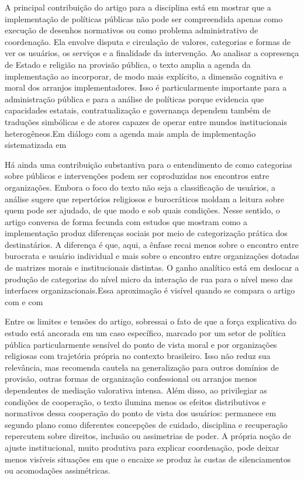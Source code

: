 \documentclass[12pt,a4paper]{article}
\begin{document}
A principal contribuição do artigo para a disciplina está em mostrar que a implementação de políticas públicas não pode ser compreendida apenas como execução de desenhos normativos ou como problema administrativo de coordenação. Ela envolve disputa e circulação de valores, categorias e formas de ver os usuários, os serviços e a finalidade da intervenção. Ao analisar a copresença de Estado e religião na provisão pública, o texto amplia a agenda da implementação ao incorporar, de modo mais explícito, a dimensão cognitiva e moral dos arranjos implementadores. Isso é particularmente importante para a administração pública e para a análise de políticas porque evidencia que capacidades estatais, contratualização e governança dependem também de traduções simbólicas e de atores capazes de operar entre mundos institucionais heterogêneos.\parencite{lotta2023_jesus_speaks}Em diálogo com a agenda mais ampla de implementação sistematizada em \parencite{lotta2019_teorias_analises}

Há ainda uma contribuição substantiva para o entendimento de como categorias sobre públicos e intervenções podem ser coproduzidas nos encontros entre organizações. Embora o foco do texto não seja a classificação de usuários, a análise sugere que repertórios religiosos e burocráticos moldam a leitura sobre quem pode ser ajudado, de que modo e sob quais condições. Nesse sentido, o artigo conversa de forma fecunda com estudos que mostram como a implementação produz diferenças sociais por meio de categorização prática dos destinatários. A diferença é que, aqui, a ênfase recai menos sobre o encontro entre burocrata e usuário individual e mais sobre o encontro entre organizações dotadas de matrizes morais e institucionais distintas. O ganho analítico está em deslocar a produção de categorias do nível micro da interação de rua para o nível meso das interfaces organizacionais.Essa aproximação é visível quando se compara o artigo com \parencite{lotta2020_categorizando_usuarios} e com \parencite{lotta2023_jesus_speaks}

Entre os limites e tensões do artigo, sobressai o fato de que a força explicativa do estudo está ancorada em um caso específico, marcado por um setor de política pública particularmente sensível do ponto de vista moral e por organizações religiosas com trajetória própria no contexto brasileiro. Isso não reduz sua relevância, mas recomenda cautela na generalização para outros domínios de provisão, outras formas de organização confessional ou arranjos menos dependentes de mediação valorativa intensa. Além disso, ao privilegiar as condições de cooperação, o texto ilumina menos os efeitos distributivos e normativos dessa cooperação do ponto de vista dos usuários: permanece em segundo plano como diferentes concepções de cuidado, disciplina e recuperação repercutem sobre direitos, inclusão ou assimetrias de poder. A própria noção de ajuste institucional, muito produtiva para explicar coordenação, pode deixar menos visíveis situações em que o encaixe se produz às custas de silenciamentos ou acomodações assimétricas.\parencite{lotta2023_jesus_speaks}
\end{document}
